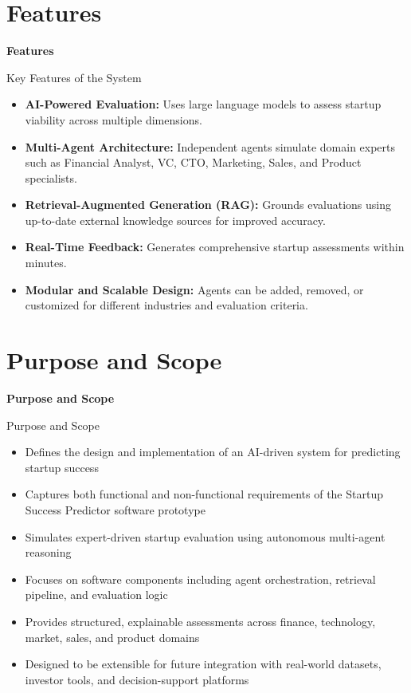 \documentclass{beamer}
\begin{document}
\section{Features}
\begin{frame}
\centering
\Huge \textbf{Features}
\end{frame}

\begin{frame}{Key Features of the System}
\begin{itemize}
    \item \textbf{AI-Powered Evaluation:} Uses large language models to assess startup viability across multiple dimensions.
    \item \textbf{Multi-Agent Architecture:} Independent agents simulate domain experts such as Financial Analyst, VC, CTO, Marketing, Sales, and Product specialists.
    \item \textbf{Retrieval-Augmented Generation (RAG):} Grounds evaluations using up-to-date external knowledge sources for improved accuracy.
    \item \textbf{Real-Time Feedback:} Generates comprehensive startup assessments within minutes.
    \item \textbf{Modular and Scalable Design:} Agents can be added, removed, or customized for different industries and evaluation criteria.
\end{itemize}
\end{frame}

\section{Purpose and Scope}

\begin{frame}
\centering
\Huge \textbf{Purpose and Scope}
\end{frame}

\begin{frame}{Purpose and Scope}
\begin{itemize}
    \item Defines the design and implementation of an AI-driven system for predicting startup success
    \item Captures both functional and non-functional requirements of the Startup Success Predictor software prototype
    \item Simulates expert-driven startup evaluation using autonomous multi-agent reasoning
    \item Focuses on software components including agent orchestration, retrieval pipeline, and evaluation logic
    \item Provides structured, explainable assessments across finance, technology, market, sales, and product domains
    \item Designed to be extensible for future integration with real-world datasets, investor tools, and decision-support platforms
\end{itemize}
\end{frame}
\end{document}
